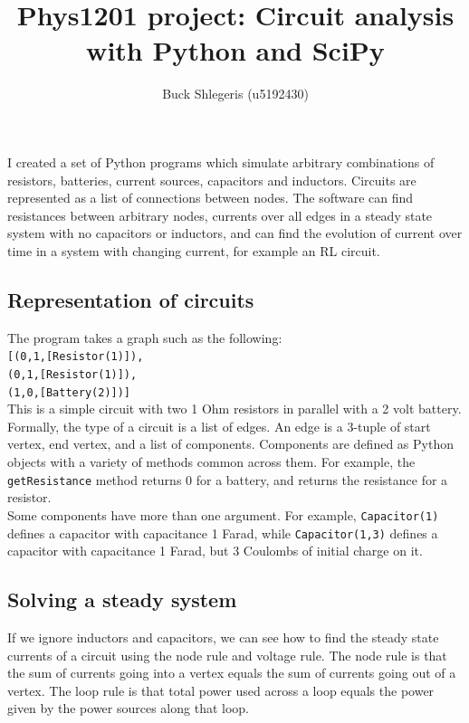 \documentclass[11pt]{article}
\title{Phys1201 project: Circuit analysis with Python and SciPy}
\author{Buck Shlegeris (u5192430)}
\begin{document}
\maketitle

I created a set of Python programs which simulate arbitrary combinations of resistors, batteries, current sources, capacitors and inductors. Circuits are represented as a list of connections between nodes. The software can find resistances between arbitrary nodes, currents over all edges in a steady state system with no capacitors or inductors, and can find the evolution of current over time in a system with changing current, for example an RL circuit.\\

\subsection*{Representation of circuits}

The program takes a graph such as the following:\\

\texttt{[(0,1,[Resistor(1)]),\\
(0,1,[Resistor(1)]),\\
(1,0,[Battery(2)])]}\\

This is a simple circuit with two 1 Ohm resistors in parallel with a 2 volt battery.\\

Formally, the type of a circuit is a list of edges. An edge is a 3-tuple of start vertex, end vertex, and a list of components. Components are defined as Python objects with a variety of methods common across them. For example, the \texttt{getResistance} method returns 0 for a battery, and returns the resistance for a resistor.\\

Some components have more than one argument. For example, \texttt{Capacitor(1)} defines a capacitor with capacitance 1 Farad, while \texttt{Capacitor(1,3)} defines a capacitor with capacitance 1 Farad, but 3 Coulombs of initial charge on it.\\

\subsection*{Solving a steady system}

If we ignore inductors and capacitors, we can see how to find the steady state currents of a circuit using the node rule and voltage rule. The node rule is that the sum of currents going into a vertex equals the sum of currents going out of a vertex. The loop rule is that total power used across a loop equals the power given by the power sources along that loop.\\
\end{document}
